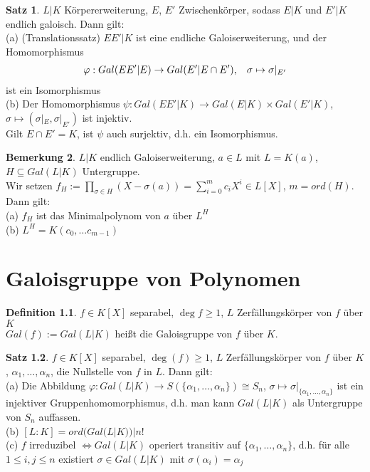 \documentclass[10pt,a4paper,numbers=endperiod]{scrreprt}
\theoremstyle{definition}
\newtheorem{satz}{Satz}[section]
\newtheorem{defi}[satz]{Definition}
\newtheorem{bem}[satz]{Bemerkung}
\begin{document}
\begin{satz}
	$L|K$ Körpererweiterung, $E$, $E'$ Zwischenkörper, sodass $E|K$ und $E'|K$ endlich galoisch. Dann gilt:\\
	(a) (Translationssatz) $EE'|K$ ist eine endliche Galoiserweiterung, und der Homomorphismus\\
	\begin{align*}
		\varphi: Gal(EE'|E) \rightarrow Gal(E'|E \cap E'), \hspace{3mm} \sigma \mapsto \sigma|_{E'}
	\end{align*}
	ist ein Isomorphismus\\
	(b) Der Homomorphismus $\psi: Gal(EE'|K) \rightarrow Gal(E|K) \times Gal(E'|K)$, $\sigma \mapsto (\sigma|_{E}, \sigma|_{E'})$ ist injektiv.\\
	Gilt $E \cap E' = K$, ist $\psi$ auch surjektiv, d.h. ein Isomorphismus.
\end{satz}

\begin{bem}
	$L|K$ endlich Galoiserweiterung, $a \in L$ mit $L = K(a)$, $H \subseteq Gal(L|K)$ Untergruppe.\\
	Wir setzen $f_H := \prod\limits_{\sigma \in H} (X - \sigma(a)) = \sum\limits_{i = 0}^m c_iX^i \in L[X]$, $m = ord(H)$. Dann gilt:\\
	(a) $f_H$ ist das Minimalpolynom von $a$ über $L^H$\\
	(b) $L^H = K(c_0, \ldots c_{m-1})$
\end{bem}

\chapter{Galoisgruppe von Polynomen}

\begin{defi}
	$f \in K[X]$ separabel, $\deg f \geq 1$, $L$ Zerfällungskörper von $f$ über $K$\\
	$Gal(f) := Gal(L|K)$ heißt die Galoisgruppe von $f$ über $K$.
\end{defi}

\begin{satz}
	$f \in K[X]$ separabel, $\deg(f) \geq 1$, $L$ Zerfällungskörper von $f$ über $K$, $\alpha_1, \ldots, \alpha_n$, die Nullstelle von $f$ in $L$. Dann gilt:\\
	(a) Die Abbildung $\varphi: Gal(L|K) \rightarrow S(\{\alpha_1, \ldots, \alpha_n\}) \cong S_n$, $\sigma \mapsto \sigma|_{\{\alpha_1, \ldots, \alpha_n\}}$ ist ein injektiver Gruppenhomomorphismus, d.h. man kann $Gal(L|K)$ als Untergruppe von $S_n$ auffassen.\\
	(b) $[L:K] = ord(Gal(L|K))|n!$\\
	(c) $f$ irreduzibel $\Leftrightarrow Gal(L|K)$ operiert transitiv auf $\{\alpha_1, \ldots, \alpha_n\}$, d.h. für alle $1 \leq i, j \leq n$ existiert $\sigma \in Gal(L|K)$ mit $\sigma(\alpha_i) = \alpha_j$ 
\end{satz}
\end{document}
